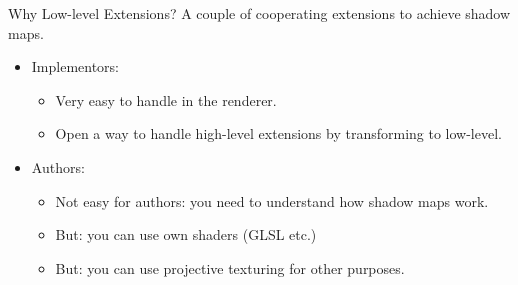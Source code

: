 \documentclass{beamer}
\begin{document}
\begin{frame}{Why Low-level Extensions?}
  A couple of cooperating extensions to achieve shadow maps.
  \begin{itemize}
    \item Implementors:
      \begin{itemize}
        \item Very easy to handle in the renderer.
        \item Open a way to handle high-level extensions by transforming to low-level.
      \end{itemize}
    \item Authors:
      \begin{itemize}
        \item \alert{Not easy for authors}: you need to understand how shadow maps work.
        \item But: you can use own shaders (GLSL etc.)
        \item But: you can use projective texturing for other purposes.
      \end{itemize}
  \end{itemize}
\end{frame}



\end{document}
